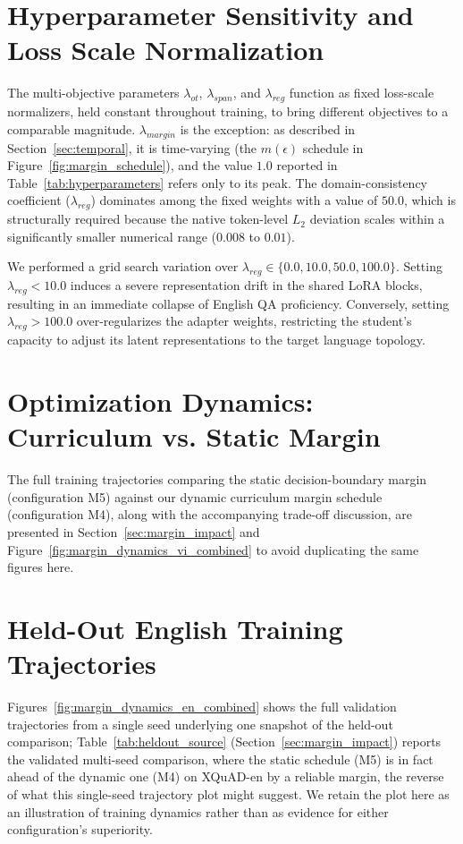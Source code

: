 \documentclass[11pt]{article}
\begin{document}
\section{Hyperparameter Sensitivity and Loss Scale Normalization}
\label{sec:appendix_sensitivity}
The multi-objective parameters $\lambda_{ot}$, $\lambda_{span}$, and $\lambda_{reg}$ function as fixed loss-scale normalizers, held constant throughout training, to bring different objectives to a comparable magnitude. $\lambda_{margin}$ is the exception: as described in Section~\ref{sec:temporal}, it is time-varying (the $m(\epsilon)$ schedule in Figure~\ref{fig:margin_schedule}), and the value $1.0$ reported in Table~\ref{tab:hyperparameters} refers only to its peak. The domain-consistency coefficient ($\lambda_{reg}$) dominates among the fixed weights with a value of $50.0$, which is structurally required because the native token-level $L_2$ deviation scales within a significantly smaller numerical range ($0.008$ to $0.01$). 

We performed a grid search variation over $\lambda_{reg} \in \{0.0, 10.0, 50.0, 100.0\}$. Setting $\lambda_{reg} < 10.0$ induces a severe representation drift in the shared LoRA blocks, resulting in an immediate collapse of English QA proficiency. Conversely, setting $\lambda_{reg} > 100.0$ over-regularizes the adapter weights, restricting the student's capacity to adjust its latent representations to the target language topology.

\section{Optimization Dynamics: Curriculum vs. Static Margin}
\label{sec:appendix_margin_dynamics}
The full training trajectories comparing the static decision-boundary margin (configuration M5) against our dynamic curriculum margin schedule (configuration M4), along with the accompanying trade-off discussion, are presented in Section~\ref{sec:margin_impact} and Figure~\ref{fig:margin_dynamics_vi_combined} to avoid duplicating the same figures here.

\section{Held-Out English Training Trajectories}
\label{sec:appendix_heldout_curves}
Figures~\ref{fig:margin_dynamics_en_combined} shows the full validation trajectories from a single seed underlying one snapshot of the held-out comparison; Table~\ref{tab:heldout_source} (Section~\ref{sec:margin_impact}) reports the validated multi-seed comparison, where the static schedule (M5) is in fact ahead of the dynamic one (M4) on XQuAD-en by a reliable margin, the reverse of what this single-seed trajectory plot might suggest. We retain the plot here as an illustration of training dynamics rather than as evidence for either configuration's superiority.
\end{document}
